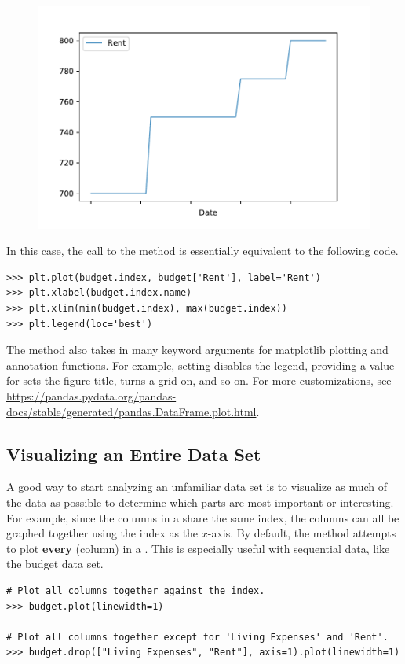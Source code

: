 \begin{figure}[H]
\centering
\includegraphics[width=.7\textwidth]{figures/rent.pdf}
\end{figure}

In this case, the call to the  method is essentially equivalent to the following code.

\begin{lstlisting}
>>> plt.plot(budget.index, budget['Rent'], label='Rent')
>>> plt.xlabel(budget.index.name)
>>> plt.xlim(min(budget.index), max(budget.index))
>>> plt.legend(loc='best')
\end{lstlisting}

The  method also takes in many keyword arguments for matplotlib plotting and annotation functions.
For example, setting  disables the legend, providing a value for  sets the figure title,  turns a grid on, and so on.
For more customizations, see \url{https://pandas.pydata.org/pandas-docs/stable/generated/pandas.DataFrame.plot.html}.

\subsection*{Visualizing an Entire Data Set} %

A good way to start analyzing an unfamiliar data set is to visualize as much of the data as possible to determine which parts are most important or interesting.
For example, since the columns in a  share the same index, the columns can all be graphed together using the index as the $x$-axis.
By default, the  method attempts to plot \textbf{every}  (column) in a .
This is especially useful with sequential data, like the budget data set.

\begin{lstlisting}
# Plot all columns together against the index.
>>> budget.plot(linewidth=1)

# Plot all columns together except for 'Living Expenses' and 'Rent'.
>>> budget.drop(["Living Expenses", "Rent"], axis=1).plot(linewidth=1)
\end{lstlisting}

